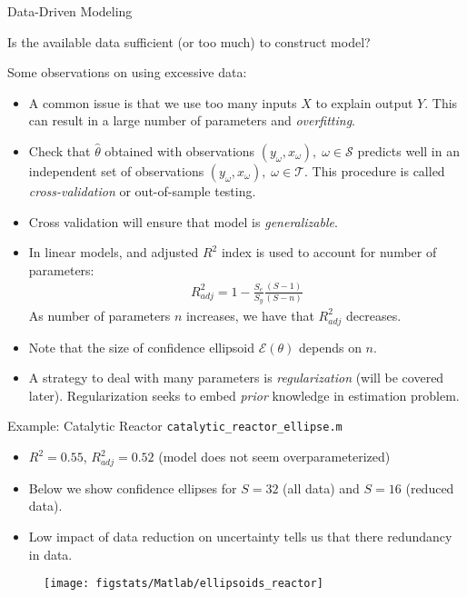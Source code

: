 \documentclass[9pt]{beamer}
\begin{document}
%
\begin{frame}{Data-Driven Modeling}

\begin{block}{}
Is the available data sufficient (or too much) to construct model?
\end{block}
Some observations on using excessive data:
\begin{itemize}
\setlength{\itemsep}{5pt}
\item A common issue is that we use too many inputs $X$ to explain output $Y$. This can result in a large number of parameters and {\em overfitting}. 
\item Check that $\hat{\theta}$ obtained with observations $(y_\omega,x_\omega),\; \omega \in \mathcal{S}$ predicts well in an independent set of observations $(y_\omega,x_\omega),\; \omega \in \mathcal{T}$. This procedure is called {\em cross-validation} or out-of-sample testing. 
\item Cross validation will ensure that model is {\em generalizable}. 
\item In linear models, and adjusted $R^2$ index is used to account for number of parameters:
\begin{align*}
R^2_{adj}=1-\frac{S_e}{S_y}\frac{(S-1)}{(S-n)}
\end{align*}
As number of parameters $n$ increases, we have that $R^2_{adj}$ decreases. 
\item Note that the size of confidence ellipsoid $\mathcal{E}(\theta)$ depends on $n$.
\item A strategy to deal with many parameters is {\em regularization} (will be covered later). Regularization seeks to embed {\em prior} knowledge in estimation problem. 
\end{itemize}

\end{frame}

%
\begin{frame}{Example: Catalytic Reactor \footnotesize{\texttt{catalytic\_reactor\_ellipse.m}}}

\begin{itemize}
\setlength{\itemsep}{5pt}
\item $R^2=0.55$, $R^2_{adj}=0.52$ (model does not seem overparameterized)
\item Below we show confidence ellipses for $S=32$ (all data) and $S=16$ (reduced data). 
\item Low impact of data reduction on uncertainty tells us that there redundancy in data. 
\end{itemize}

\begin{figure}[!htb]
    \centering
	\texttt{[image: figstats/Matlab/ellipsoids\_reactor]}
\end{figure}

\end{frame}
\end{document}
